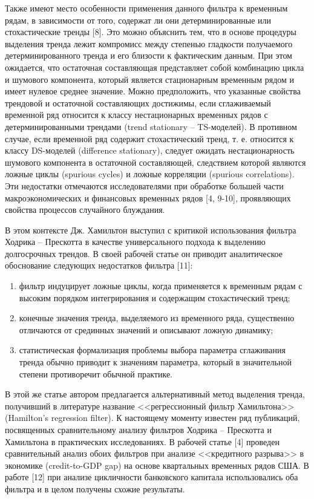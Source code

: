 \documentclass[a4paper,14pt]{extreport}
\begin{document}
	Также имеют место особенности применения данного фильтра к временным рядам, в зависимости от того, содержат ли они детерминированные или стохастические тренды [8]. Это можно объяснить тем, что в основе процедуры выделения тренда лежит компромисс между степенью гладкости получаемого детерминированного тренда и его близости к фактическим данным. При этом ожидается, что остаточная составляющая представляет собой комбинацию цикла и шумового компонента, который является стационарным временным рядом и имеет нулевое среднее значение. Можно предположить, что указанные свойства трендовой и остаточной составляющих достижимы, если сглаживаемый временной ряд относится к классу нестационарных временных рядов с детерминированными трендами (trend stationary – TS-моделей).  В противном случае, если временной ряд содержит стохастический тренд, т. е. относится к классу DS-моделей (difference stationary), следует ожидать нестационарность шумового компонента в остаточной составляющей, следствием которой являются ложные циклы (spurious cycles) и ложные корреляции (spurious correlations). Эти недостатки отмечаются исследователями при обработке большей части макроэкономических и финансовых временных рядов [4, 9-10], проявляющих свойства процессов случайного блуждания.
	
	В этом контексте Дж. Хамильтон выступил с критикой использования фильтра Ходрика – Прескотта в качестве универсального подхода к выделению долгосрочных трендов. В своей рабочей статье он приводит аналитическое обоснование следующих недостатков фильтра [11]:
	
	\begin{enumerate}
		\item фильтр индуцирует ложные циклы, когда применяется к временным рядам с высоким порядком интегрирования и содержащим стохастический тренд;
		\item конечные значения тренда, выделяемого из временного ряда, существенно отличаются от срединных значений и описывают ложную динамику;
		\item статистическая формализация проблемы выбора параметра сглаживания тренда обычно приводит к значениям параметра, который в значительной степени противоречит обычной практике.
	\end{enumerate}
	
	В этой же статье автором предлагается альтернативный метод выделения тренда, получивший в литературе название <<регрессионный фильтр Хамильтона>> (Hamilton's regression filter). К настоящему моменту известен ряд публикаций, посвященных сравнительному анализу фильтров Ходрика – Прескотта и Хамильтона в практических исследованиях. В рабочей статье [4] проведен сравнительный анализ обоих фильтров при анализе <<кредитного разрыва>> в экономике (credit-to-GDP gap) на основе квартальных временных рядов США. В работе [12] при анализе цикличности банковского капитала использовались оба фильтра и в целом получены схожие результаты.
	
\end{document}
